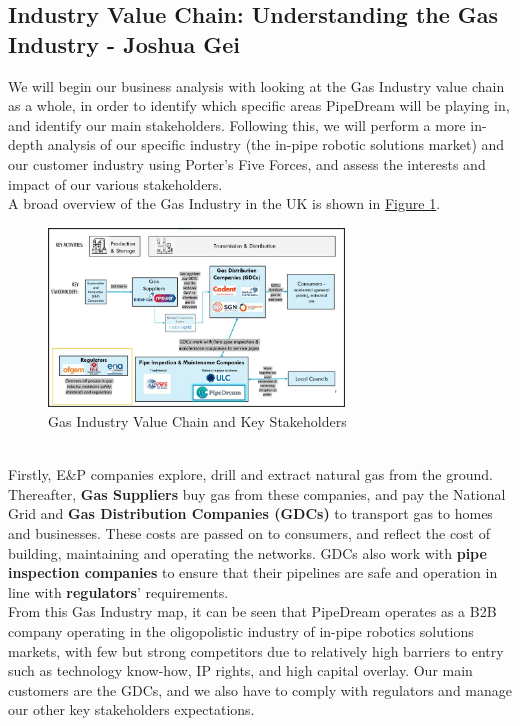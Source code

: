 \documentclass[11pt]{article}		%
\newcommand{\figref}[1]{\hyperref[#1]{Figure \ref*{#1}}}    %
\begin{document}
		\subsection[Industry Value Chain]{Industry Value Chain: Understanding the Gas Industry - Joshua Gei}\label{valueChainSection}
		We will begin our business analysis with looking at the Gas Industry value chain as a whole, in order to identify which specific areas PipeDream will be playing in, and identify our main stakeholders. Following this, we will perform a more in-depth analysis of our specific industry (the in-pipe robotic solutions market) and our customer industry using Porter’s Five Forces, and assess the interests and impact of our various stakeholders. 
        \\\hspace*{3ex}A broad overview of the Gas Industry in the UK is shown in \figref{Industry Value Chain}.
		\begin{figure}[h]
				\centering
				\includegraphics[width=0.7\textwidth]{industryvaluechain.jpg}
				\caption{Gas Industry Value Chain and Key Stakeholders}
				\label{Industry Value Chain}
			\end{figure}
		\\\hspace*{3ex}Firstly, E\&P companies explore, drill and extract natural gas from the ground. Thereafter, \textbf{Gas Suppliers} buy gas from these companies, and pay the National Grid and \textbf{Gas Distribution Companies (GDCs)} to transport gas to homes and businesses. These costs are passed on to consumers, and reflect the cost of building, maintaining and operating the networks. GDCs also work with \textbf{pipe inspection companies} to ensure that their pipelines are safe and operation in line with \textbf{regulators}’ requirements. 
        \\\hspace*{3ex}From this Gas Industry map, it can be seen that PipeDream operates as a B2B company operating in the oligopolistic industry of in-pipe robotics solutions markets, with few but strong competitors due to relatively high barriers to entry such as technology know-how, IP rights, and high capital overlay. Our main customers are the GDCs, and we also have to comply with regulators and manage our other key stakeholders expectations. 
\end{document}
